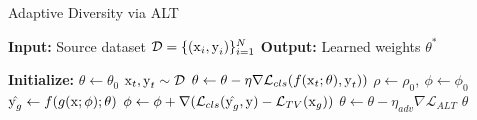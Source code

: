 \begin{algorithm}[t]
    \caption{Adaptive Diversity via ALT}
    \begin{algorithmic}[0]
        \State \textbf{Input:} Source dataset $\mathcal{D}=\{(\operatorname{\mathrm{x}}_i,\operatorname{\mathrm{y}}_i)\}_{i=1}^N$ 
        \State \textbf{Output:} Learned weights $\theta^*$  
    \end{algorithmic}
    \begin{algorithmic}[1]
        \State \textbf{Initialize:} $\theta\gets\theta_0$ 
            \State $\operatorname{\mathrm{x}}_t, \operatorname{\mathrm{y}}_t \sim\mathcal{D}$ 
                \State $\theta\gets\theta - \eta\nabla \mathcal{L}_{cls}(f(\operatorname{\mathrm{x}}_t;\theta), \operatorname{\mathrm{y}}_t))$ 
            \Else
                \State $\rho\gets\rho_0,~\phi\gets\phi_0$
                    \State $\hat{\operatorname{\mathrm{y}}_g} \gets f(g(\operatorname{\mathrm{x}};\phi);\theta)$
                    \State $\phi\gets\phi+\nabla(\mathcal{L}_{cls}(\hat{\operatorname{\mathrm{y}}_g}, \operatorname{\mathrm{y}}) - \mathcal{L}_{TV}(\operatorname{\mathrm{x}}_g))$
                \EndForEach
                \State $\theta\gets\theta-\eta_{adv}\nabla\mathcal{L}_{ALT}$ 
            \EndIf 
        \EndForEach
        \State\Return $\theta$
\end{algorithmic}
\label{algo}
\end{algorithm}


